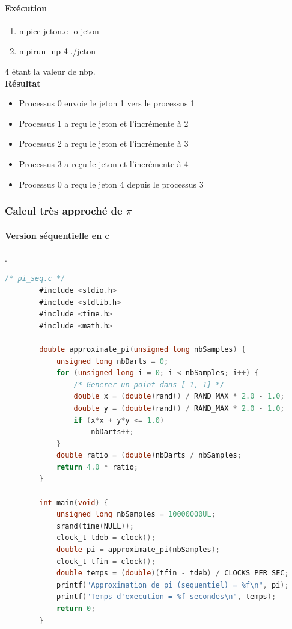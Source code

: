 \documentclass[a4paper,13pt]{book}
\begin{document}
\paragraph{Exécution}
\begin{enumerate}
    \item mpicc jeton.c -o jeton
    \item mpirun -np 4 ./jeton
\end{enumerate}
4 étant la valeur de nbp.\\
\textbf{Résultat}
\begin{itemize}
\item Processus 0 envoie le jeton 1 vers le processus 1
\item Processus 1 a reçu le jeton et l'incrémente à 2
\item Processus 2 a reçu le jeton et l'incrémente à 3
\item Processus 3 a reçu le jeton et l'incrémente à 4
\item Processus 0 a reçu le jeton 4 depuis le processus 3
\end{itemize}
\subsubsection{Calcul très approché de $\pi$}
\paragraph{Version séquentielle en c}.\\

	\begin{lstlisting}[language=C]
        /* pi_seq.c */
        #include <stdio.h>
        #include <stdlib.h>
        #include <time.h>
        #include <math.h>
        
        double approximate_pi(unsigned long nbSamples) {
            unsigned long nbDarts = 0;
            for (unsigned long i = 0; i < nbSamples; i++) {
                /* Generer un point dans [-1, 1] */
                double x = (double)rand() / RAND_MAX * 2.0 - 1.0;
                double y = (double)rand() / RAND_MAX * 2.0 - 1.0;
                if (x*x + y*y <= 1.0)
                    nbDarts++;
            }
            double ratio = (double)nbDarts / nbSamples;
            return 4.0 * ratio;
        }
        
        int main(void) {
            unsigned long nbSamples = 10000000UL; 
            srand(time(NULL));
            clock_t tdeb = clock();
            double pi = approximate_pi(nbSamples);
            clock_t tfin = clock();
            double temps = (double)(tfin - tdeb) / CLOCKS_PER_SEC;
            printf("Approximation de pi (sequentiel) = %f\n", pi);
            printf("Temps d'execution = %f secondes\n", temps);
            return 0;
        }
        
        
\end{lstlisting}
\end{document}
